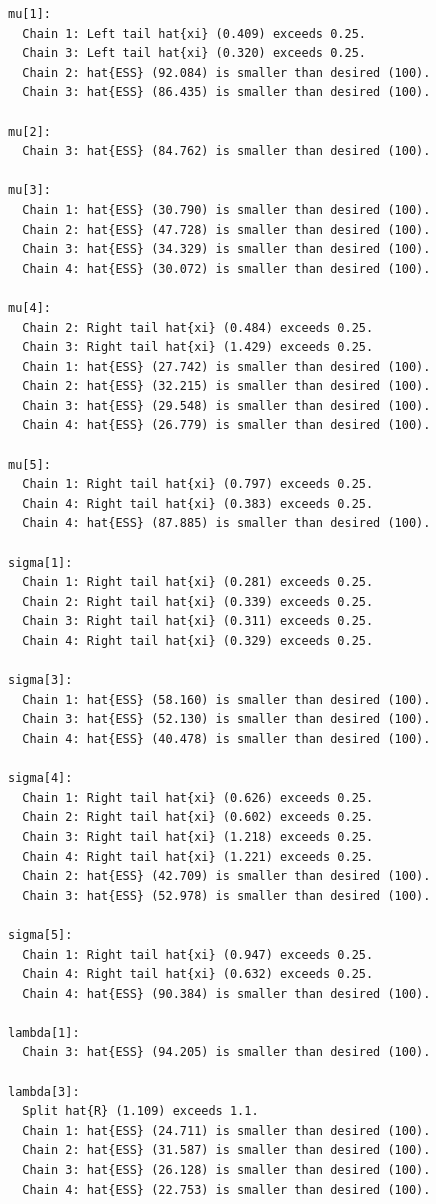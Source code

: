 \documentclass[
  letterpaper,
  DIV=11,
  numbers=noendperiod]{scrartcl}
\begin{document}
\begin{verbatim}
mu[1]:
  Chain 1: Left tail hat{xi} (0.409) exceeds 0.25.
  Chain 3: Left tail hat{xi} (0.320) exceeds 0.25.
  Chain 2: hat{ESS} (92.084) is smaller than desired (100).
  Chain 3: hat{ESS} (86.435) is smaller than desired (100).

mu[2]:
  Chain 3: hat{ESS} (84.762) is smaller than desired (100).

mu[3]:
  Chain 1: hat{ESS} (30.790) is smaller than desired (100).
  Chain 2: hat{ESS} (47.728) is smaller than desired (100).
  Chain 3: hat{ESS} (34.329) is smaller than desired (100).
  Chain 4: hat{ESS} (30.072) is smaller than desired (100).

mu[4]:
  Chain 2: Right tail hat{xi} (0.484) exceeds 0.25.
  Chain 3: Right tail hat{xi} (1.429) exceeds 0.25.
  Chain 1: hat{ESS} (27.742) is smaller than desired (100).
  Chain 2: hat{ESS} (32.215) is smaller than desired (100).
  Chain 3: hat{ESS} (29.548) is smaller than desired (100).
  Chain 4: hat{ESS} (26.779) is smaller than desired (100).

mu[5]:
  Chain 1: Right tail hat{xi} (0.797) exceeds 0.25.
  Chain 4: Right tail hat{xi} (0.383) exceeds 0.25.
  Chain 4: hat{ESS} (87.885) is smaller than desired (100).

sigma[1]:
  Chain 1: Right tail hat{xi} (0.281) exceeds 0.25.
  Chain 2: Right tail hat{xi} (0.339) exceeds 0.25.
  Chain 3: Right tail hat{xi} (0.311) exceeds 0.25.
  Chain 4: Right tail hat{xi} (0.329) exceeds 0.25.

sigma[3]:
  Chain 1: hat{ESS} (58.160) is smaller than desired (100).
  Chain 3: hat{ESS} (52.130) is smaller than desired (100).
  Chain 4: hat{ESS} (40.478) is smaller than desired (100).

sigma[4]:
  Chain 1: Right tail hat{xi} (0.626) exceeds 0.25.
  Chain 2: Right tail hat{xi} (0.602) exceeds 0.25.
  Chain 3: Right tail hat{xi} (1.218) exceeds 0.25.
  Chain 4: Right tail hat{xi} (1.221) exceeds 0.25.
  Chain 2: hat{ESS} (42.709) is smaller than desired (100).
  Chain 3: hat{ESS} (52.978) is smaller than desired (100).

sigma[5]:
  Chain 1: Right tail hat{xi} (0.947) exceeds 0.25.
  Chain 4: Right tail hat{xi} (0.632) exceeds 0.25.
  Chain 4: hat{ESS} (90.384) is smaller than desired (100).

lambda[1]:
  Chain 3: hat{ESS} (94.205) is smaller than desired (100).

lambda[3]:
  Split hat{R} (1.109) exceeds 1.1.
  Chain 1: hat{ESS} (24.711) is smaller than desired (100).
  Chain 2: hat{ESS} (31.587) is smaller than desired (100).
  Chain 3: hat{ESS} (26.128) is smaller than desired (100).
  Chain 4: hat{ESS} (22.753) is smaller than desired (100).


\end{verbatim}
\end{document}
